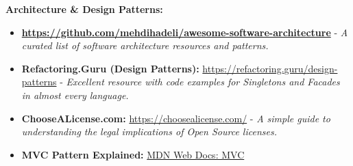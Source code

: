 \documentclass[a4paper,12pt]{article}
\begin{document}
\textbf{Architecture \& Design Patterns:}
\begin{itemize}
    \item \textbf{\href{https://github.com/mehdihadeli/awesome-software-architecture}{https://github.com/mehdihadeli/awesome-software-architecture}} - \textit{A curated list of software architecture resources and patterns.}
    \item \textbf{Refactoring.Guru (Design Patterns):} \href{https://refactoring.guru/design-patterns}{https://refactoring.guru/design-patterns} - \textit{Excellent resource with code examples for Singletons and Facades in almost every language.}
    \item \textbf{ChooseALicense.com:} \href{https://choosealicense.com/}{https://choosealicense.com/} - \textit{A simple guide to understanding the legal implications of Open Source licenses.}
    \item \textbf{MVC Pattern Explained:} \href{https://developer.mozilla.org/en-US/docs/Glossary/MVC}{MDN Web Docs: MVC}
\end{itemize}
\end{document}
